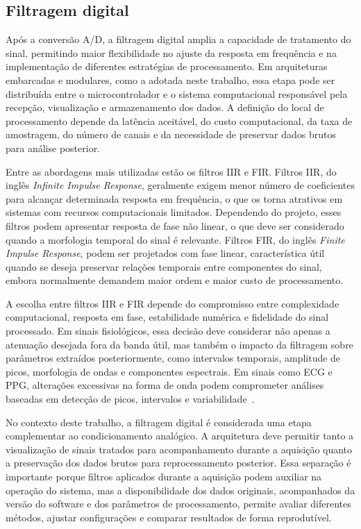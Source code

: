 \documentclass[a4paper,12pt]{fcte}
\begin{document}
\subsection{Filtragem digital}

Após a conversão A/D, a filtragem digital amplia a capacidade de tratamento do sinal, permitindo maior flexibilidade no ajuste da resposta em frequência e na implementação de diferentes estratégias de processamento. Em arquiteturas embarcadas e modulares, como a adotada neste trabalho, essa etapa pode ser distribuída entre o microcontrolador e o sistema computacional responsável pela recepção, visualização e armazenamento dos dados. A definição do local de processamento depende da latência aceitável, do custo computacional, da taxa de amostragem, do número de canais e da necessidade de preservar dados brutos para análise posterior.

Entre as abordagens mais utilizadas estão os filtros IIR e FIR. Filtros IIR, do inglês \textit{Infinite Impulse Response}, geralmente exigem menor número de coeficientes para alcançar determinada resposta em frequência, o que os torna atrativos em sistemas com recursos computacionais limitados. Dependendo do projeto, esses filtros podem apresentar resposta de fase não linear, o que deve ser considerado quando a morfologia temporal do sinal é relevante. Filtros FIR, do inglês \textit{Finite Impulse Response}, podem ser projetados com fase linear, característica útil quando se deseja preservar relações temporais entre componentes do sinal, embora normalmente demandem maior ordem e maior custo de processamento.

A escolha entre filtros IIR e FIR depende do compromisso entre complexidade computacional, resposta em fase, estabilidade numérica e fidelidade do sinal processado. Em sinais fisiológicos, essa decisão deve considerar não apenas a atenuação desejada fora da banda útil, mas também o impacto da filtragem sobre parâmetros extraídos posteriormente, como intervalos temporais, amplitude de picos, morfologia de ondas e componentes espectrais. Em sinais como ECG e PPG, alterações excessivas na forma de onda podem comprometer análises baseadas em detecção de picos, intervalos e variabilidade~\cite{ardeti2023ecg,charlton2022wearable_ppg}.

No contexto deste trabalho, a filtragem digital é considerada uma etapa complementar ao condicionamento analógico. A arquitetura deve permitir tanto a visualização de sinais tratados para acompanhamento durante a aquisição quanto a preservação dos dados brutos para reprocessamento posterior. Essa separação é importante porque filtros aplicados durante a aquisição podem auxiliar na operação do sistema, mas a disponibilidade dos dados originais, acompanhados da versão do software e dos parâmetros de processamento, permite avaliar diferentes métodos, ajustar configurações e comparar resultados de forma reprodutível.
\end{document}
